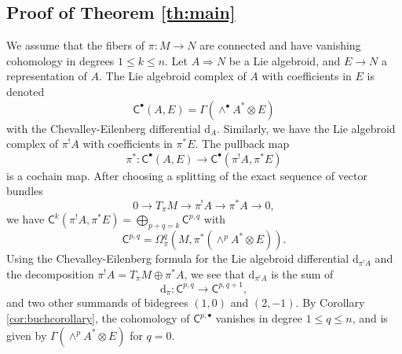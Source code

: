 \documentclass[11pt]{amsart}
\theoremstyle{definition}
\theoremstyle{remark}
\newcommand{\Ra}{\Rightarrow}
\renewcommand{\d}{{\mbox{d}}}
\newcommand{\CC}{\mathsf{C}}
\begin{document}
\subsection{Proof of Theorem \ref{th:main}}
We assume that the fibers of $\pi\colon M\to N$ are connected and have vanishing cohomology in degrees $1\le k\le n$. Let 
$A\Ra N$ be a Lie algebroid, and $E\to N$ a representation of $A$. The Lie algebroid complex of $A$ with coefficients in $E$ is denoted 
\[ \CC^\bullet(A,E)=\Gamma(\wedge^\bullet A^*\otimes E)\]
with the Chevalley-Eilenberg differential $\d_A$. 
Similarly, we have the Lie algebroid complex of $\pi^!A$ with coefficients in $\pi^*E$. The pullback map  
\begin{equation}\label{eq:pistarforms}
\pi^*\colon \CC^\bullet(A,E)\to \CC^\bullet(\pi^!A,\pi^*E)
\end{equation}
is a cochain map. After choosing a splitting of the exact sequence of vector bundles
\[ 0\to T_\pi M\to \pi^!A\to \pi^*A\to 0,\]
we have $\CC^k(\pi^!A,\pi^*E)=\bigoplus_{p+q=k}\CC^{p,q}$ with 
%
\[ \CC^{p,q}=\Omega^q_\pi(M,\pi^*(\wedge^p A^*\otimes E)).\]
Using the Chevalley-Eilenberg formula for the Lie algebroid differential $\d_{\pi^!A}$ and the decomposition 
$\pi^!A=T_\pi M\oplus \pi^*A$, we see that $\d_{\pi^!A}$ is the sum of 
%
\[ \d_\pi\colon \CC^{p,q}\to \CC^{p,q+1},\]
%
and two other summands of bidegrees $(1,0)$ and $(2,-1)$.  
By Corollary \ref{cor:buchcorollary}, the cohomology of $\CC^{p,\bullet}$ vanishes in degree $1\le q\le n$, and is given by 
$\Gamma(\wedge^p A^*\otimes E)$ for $q=0$. 
\end{document}
